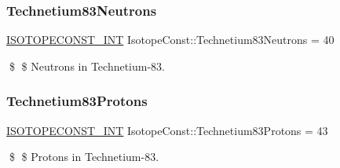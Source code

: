 \subsubsection{\texorpdfstring{Technetium83\+Neutrons}{Technetium83Neutrons}}
{\footnotesize\ttfamily \mbox{\hyperlink{group___isotope_const-_macros_ga5f18360b3e99483a35c32d789e62621c}{I\+S\+O\+T\+O\+P\+E\+C\+O\+N\+S\+T\+\_\+\+I\+NT}} Isotope\+Const\+::\+Technetium83\+Neutrons = 40}

\$ \$ Neutrons in Technetium-\/83. \mbox{\label{group___isotope_const-_technetium-_tc83_gaa274c19816c1aa9b59d8d338dfaff2c1}} 
\subsubsection{\texorpdfstring{Technetium83\+Protons}{Technetium83Protons}}
{\footnotesize\ttfamily \mbox{\hyperlink{group___isotope_const-_macros_ga5f18360b3e99483a35c32d789e62621c}{I\+S\+O\+T\+O\+P\+E\+C\+O\+N\+S\+T\+\_\+\+I\+NT}} Isotope\+Const\+::\+Technetium83\+Protons = 43}

\$ \$ Protons in Technetium-\/83. 